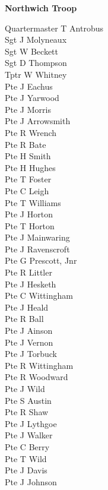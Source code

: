 \begin{center}
  \Large
  \textbf{Northwich Troop}
\end{center}

\begin{multicols}{2}
  \noindent
  Quartermaster T Antrobus \\
  Sgt J Molyneaux \\
  Sgt W Beckett \\
  Sgt D Thompson \\
  Tptr W Whitney \\
  Pte J Eachus \\
  Pte J Yarwood \\
  Pte J Morris \\
  Pte J Arrowsmith \\
  Pte R Wrench \\
  Pte R Bate \\
  Pte H Smith \\
  Pte H Hughes \\
  Pte T Foster \\
  Pte C Leigh \\
  Pte T Williams \\
  Pte J Horton \\
  Pte T Horton \\
  Pte J Mainwaring \\
  Pte J Ravenscroft \\
  Pte G Prescott, Jnr \\
  Pte R Littler \\
  Pte J Hesketh \\
  Pte C Wittingham \\
  Pte J Heald \\
  Pte R Ball \\
  Pte J Ainson \\
  Pte J Vernon \\
  Pte J Torbuck \\
  Pte R Wittingham \\
  Pte R Woodward \\
  Pte J Wild \\
  Pte S Austin \\
  Pte R Shaw \\
  Pte J Lythgoe \\
  Pte J Walker \\
  Pte C Berry \\
  Pte T Wild \\
  Pte J Davis \\
  Pte J Johnson \\

\end{multicols}
